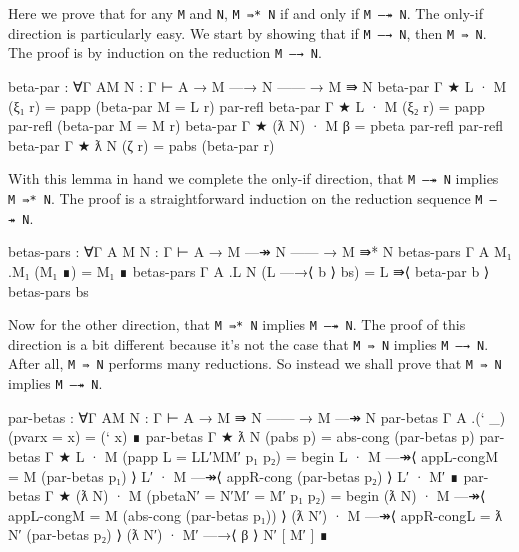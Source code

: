 Here we prove that for any \texttt{M} and \texttt{N}, \texttt{M\ ⇛*\ N}
if and only if \texttt{M\ —↠\ N}. The only-if direction is particularly
easy. We start by showing that if \texttt{M\ —→\ N}, then
\texttt{M\ ⇛\ N}. The proof is by induction on the reduction
\texttt{M\ —→\ N}.

\begin{fence}
\begin{code}
beta-par : ∀{Γ A}{M N : Γ ⊢ A}
  → M —→ N
    ------
  → M ⇛ N
beta-par {Γ} {★} {L · M} (ξ₁ r) = papp (beta-par {M = L} r) par-refl
beta-par {Γ} {★} {L · M} (ξ₂ r) = papp par-refl (beta-par {M = M} r)
beta-par {Γ} {★} {(ƛ N) · M} β = pbeta par-refl par-refl
beta-par {Γ} {★} {ƛ N} (ζ r) = pabs (beta-par r)
\end{code}
\end{fence}

With this lemma in hand we complete the only-if direction, that
\texttt{M\ —↠\ N} implies \texttt{M\ ⇛*\ N}. The proof is a
straightforward induction on the reduction sequence \texttt{M\ —↠\ N}.

\begin{fence}
\begin{code}
betas-pars : ∀{Γ A} {M N : Γ ⊢ A}
  → M —↠ N
    ------
  → M ⇛* N
betas-pars {Γ} {A} {M₁} {.M₁} (M₁ ∎) = M₁ ∎
betas-pars {Γ} {A} {.L} {N} (L —→⟨ b ⟩ bs) =
   L ⇛⟨ beta-par b ⟩ betas-pars bs
\end{code}
\end{fence}

Now for the other direction, that \texttt{M\ ⇛*\ N} implies
\texttt{M\ —↠\ N}. The proof of this direction is a bit different
because it's not the case that \texttt{M\ ⇛\ N} implies
\texttt{M\ —→\ N}. After all, \texttt{M\ ⇛\ N} performs many reductions.
So instead we shall prove that \texttt{M\ ⇛\ N} implies
\texttt{M\ —↠\ N}.

\begin{fence}
\begin{code}
par-betas : ∀{Γ A}{M N : Γ ⊢ A}
  → M ⇛ N
    ------
  → M —↠ N
par-betas {Γ} {A} {.(` _)} (pvar{x = x}) = (` x) ∎
par-betas {Γ} {★} {ƛ N} (pabs p) = abs-cong (par-betas p)
par-betas {Γ} {★} {L · M} (papp {L = L}{L′}{M}{M′} p₁ p₂) =
    begin
    L · M   —↠⟨ appL-cong{M = M} (par-betas p₁) ⟩
    L′ · M  —↠⟨ appR-cong (par-betas p₂) ⟩
    L′ · M′
    ∎
par-betas {Γ} {★} {(ƛ N) · M} (pbeta{N′ = N′}{M′ = M′} p₁ p₂) =
    begin
    (ƛ N) · M                    —↠⟨ appL-cong{M = M} (abs-cong (par-betas p₁)) ⟩
    (ƛ N′) · M                   —↠⟨ appR-cong{L = ƛ N′} (par-betas p₂)  ⟩
    (ƛ N′) · M′                  —→⟨ β ⟩
     N′ [ M′ ]
    ∎
\end{code}
\end{fence}

